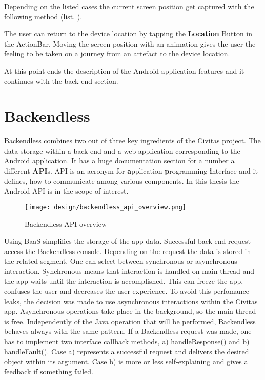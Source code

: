Depending on the listed cases the current screen position get captured with the following method (list. ).

\fbox{

}

The user can return to the device location by tapping the \textbf{Location} Button in the ActionBar.
Moving the screen position with an animation gives the user the feeling to be taken on a journey from an artefact to the device location.

At this point ends the description of the Android application features and it continues with the back-end section. 



\section{Backendless}

Backendless combines two out of three key ingredients of the Civitas project. The data storage within a back-end and a web application corresponding to the Android application. It has a huge documentation section for a number a different \textbf{API}s. API is an acronym for \textbf{a}pplication \textbf{p}rogramming \textbf{i}nterface and it defines, how to communicate among various components. In this thesis the Android API is in the scope of interest.

\begin{figure}[H]
	\centering \texttt{[image: design/backendless\_api\_overview.png]}
	\caption{Backendless API overview}
	\label{fig:backendless_api_overview}
\end{figure}


Using BaaS simplifies the storage of the app data. Successful back-end request access the Backendless console. Depending on the request the data is stored in the related segment. One can select between synchronous or asynchronous interaction. Synchronous means that interaction is handled on main thread and the app waits until the interaction is accomplished. This can freeze the app, confuses the user and decreases the user experience. To avoid this perfomance leaks, the decision was made to use asynchronous interactions within the Civitas app. Asynchronous operations take place in the background, so the main thread is free. 
Independently of the Java operation that will be performed, Backendless behaves always with the same pattern. If a Backendless request was made, one has to implement two interface callback methods, a) handleResponse() and b) handleFault(). Case a) represents a successful request and delivers the desired object within its argument. Case b) is more or less self-explaining and gives a feedback if something failed.

